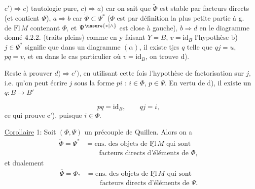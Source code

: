 $c')\Longrightarrow c)$ tautologie pure, $c)\Longrightarrow a)$ car on sait que $\widetilde\Phi$ est stable par facteurs directs (et contient $\Phi$), $a\Longrightarrow b$ car $\widetilde\Phi\subset\Psi^*$ ($\widetilde\Phi$ est par définition la plus petite partie  à g. de $\mathrm{Fl}\,M$ contenant $\Phi$, et $\Psi^{\unsure{*|\wedge}}$ est close à gauche), $b\Longrightarrow d$ en  le diagramme donné 4.2.2. (traits pleins) comme
en y faisant  $Y=B$, $v=\mathrm{id}_B$  l'hypothèse b) $j\in\Psi^*$ signifie que dans un diagramme  $(\alpha)$, il existe tjrs $q$ telle que $qj=u$, $pq=v$, et en  dans le cas particulier où $v=\mathrm{id}_B$, on trouve d).

Reste à prouver $d)\Longrightarrow c')$, en utilisant cette fois l'hypothèse de factorisation sur $j$, i.e. qu'on peut écrire $j$ sous la forme $pi$ :
 $i\in\Phi$, $p\in\Psi$. En vertu de d),  il existe un $q:B\longrightarrow B'$ 

\[
pq=\mathrm{id}_B,\qquad qj=i,
\]
ce qui prouve c'), puisque $i\in\Phi$.

\uline{Corollaire} 1: Soit $(\Phi,\Psi)$ un précouple de Quillen. Alors on a
\[
\begin{aligned}
\widetilde\Phi=\Psi^*&=\text{ens. des objets de }\underline{\mathrm{Fl}}\,M\text{ qui sont}\\
&\qquad\text{facteurs directs d'éléments de }\Phi,
\end{aligned}
\tag*{(4.3.)}
\]
et dualement
\[
\begin{aligned}
\overline\Psi=\Phi_*&=\text{ens. des objets de }\underline{\mathrm{Fl}}\,M\text{ qui sont}\\
&\qquad\text{facteurs directs d'éléments de }\Psi.
\end{aligned}
\tag*{(4.4)}
\]

